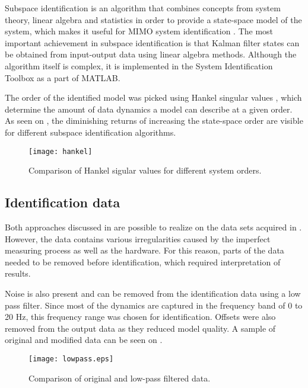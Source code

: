 Subspace identification is an algorithm that combines concepts from system theory, linear algebra and statistics in order to provide a state-space model of the system, which makes it useful for MIMO system identification \cite{van2012subspace}. 
The most important achievement in subspace identification is that Kalman filter states can be obtained from input-output data using linear algebra methods.
Although the algorithm itself is complex, it is implemented in the System Identification Toolbox as a part of MATLAB.

The order of the identified model was picked using Hankel singular values \cite{gawronski1990model}, which determine the amount of data dynamics a model can describe at a given order.
As seen on , the diminishing returns of increasing the state-space order are visible for different subspace identification algorithms.%

\begin{figure}[H]
\centering
\texttt{[image: hankel]}
\caption{Comparison of Hankel sigular values for different system orders.}
\label{hankel}
\end{figure}

\subsection{Identification data}

Both approaches discussed in  are possible to realize on the data sets acquired in .
However, the data contains various irregularities caused by the imperfect measuring process as well as the hardware. 
For this reason, parts of the data needed to be removed before identification, which required interpretation of results.

Noise is also present and can be removed from the identification data using a low pass filter.
Since most of the dynamics are captured in the frequency band of 0 to 20 Hz, this frequency range was chosen for identification.
Offsets were also removed from the output data as they reduced model quality.
A sample of original and modified data can be seen on .

\begin{figure}[H]
\centering
\texttt{[image: lowpass.eps]}
\caption{Comparison of original and low-pass filtered data.}
\label{figlowpass}
\end{figure}

